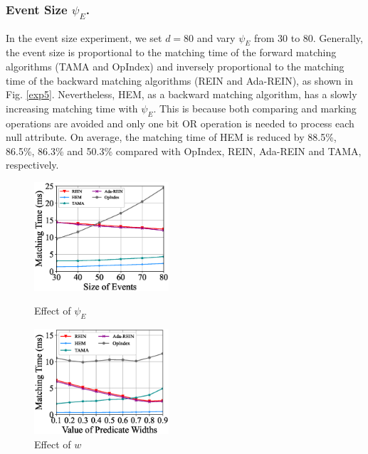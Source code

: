 \documentclass[runningheads]{llncs}
\begin{document}
\subsubsection{Event Size $\psi_E$.}
In the event size experiment, we set $d=80$ and vary $\psi_E$ from 30 to 80. Generally, the event size is proportional to the matching time of the forward matching algorithms (TAMA and OpIndex) and inversely proportional to the matching time of the backward matching algorithms (REIN and Ada-REIN), as shown in Fig. \ref{exp5}. Nevertheless, HEM, as a backward matching algorithm, has a slowly increasing matching time with $\psi_E$. This is because both comparing and marking operations are avoided and only one bit OR operation is needed to process each null attribute. On average, the matching time of HEM is reduced by 88.5\%, 86.5\%, 86.3\% and 50.3\% compared with OpIndex, REIN, Ada-REIN and TAMA, respectively.

\begin{figure}[htbp]
\centering
\begin{minipage}[t]{0.48\textwidth}
\centering
\includegraphics[width=5cm]{figures/exp5_Se.eps}
\caption{Effect of $\psi_E$}
\label{exp5}
\end{minipage}
\begin{minipage}[t]{0.48\textwidth}
\centering
 \includegraphics[width=5cm]{figures/exp6_w.eps}
\caption{Effect of $w$}
\label{exp6}
\end{minipage}
\end{figure}
\end{document}
